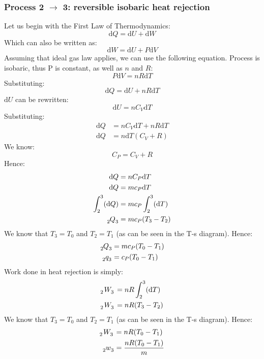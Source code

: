 \documentclass[12pt]{article}
\numberwithin{equation}{section}
\begin{document}
\begin{flushleft}
\subsubsection*{Process 2 $\rightarrow$ 3: reversible isobaric heat rejection}
Let us begin with the First Law of Thermodynamics:
\begin{equation}
  \mathrm{d}Q = \mathrm{d}U + \mathrm{d}W
\end{equation}
Which can also be written as:
\begin{equation}
  \mathrm{d}W = \mathrm{d}U + P\mathrm{d}V
\end{equation}
Assuming that ideal gas law applies, we can use the following equation. Process is isobaric, thus P is constant, as well as $n$ and $R$:
\begin{equation}
  P\mathrm{d}V = nR\mathrm{d}T
\end{equation}
Substituting:
\begin{equation}
  \mathrm{d}Q = \mathrm{d}U + nR\mathrm{d}T
\end{equation}
$\mathrm{d}U$ can be rewritten:
\begin{equation}
  \mathrm{d}U = nC_V \mathrm{d}T 
\end{equation}
Substituting:
\begin{align}
  \mathrm{d}Q &= nC_V \mathrm{d}T + nR\mathrm{d}T\\
  \mathrm{d}Q &= n\mathrm{d}T (C_V + R)
\end{align}
We know:
\begin{equation}
  C_P = C_V +R 
\end{equation}
Hence:
\begin{align}
  \mathrm{d}Q &= nC_P \mathrm{d}T\\
  \mathrm{d}Q &= mc_P \mathrm{d}T\\
  \int_2^3 (\mathrm{d}Q) &= mc_P \int_2^3 (\mathrm{d}T)\\
  \tensor[_2]{Q}{_3} &= mc_P (T_3 - T_2)
\end{align}
We know that $T_3 = T_0$ and $T_2 = T_1$ (as can be seen in the T-s diagram). Hence:
\begin{align}
  \tensor[_2]{Q}{_3} &= mc_P (T_0 - T_1)\\
  \tensor[_2]{q}{_3} &= c_P (T_0 - T_1)
\end{align}
Work done in heat rejection is simply:
\begin{align}
  \tensor[_2]{W}{_3} &= nR\int_2^3(\mathrm{d}T)\\
  \tensor[_2]{W}{_3} &= nR(T_3 - T_2)
\end{align}
We know that $T_3 = T_0$ and $T_2 = T_1$ (as can be seen in the T-s diagram). Hence:
\begin{align}
  \tensor[_2]{W}{_3} &= nR(T_0 - T_1)\\
  \tensor[_2]{w}{_3} &= \frac{nR(T_0 - T_1)}{m}
\end{align}

\end{flushleft}
\end{document}
